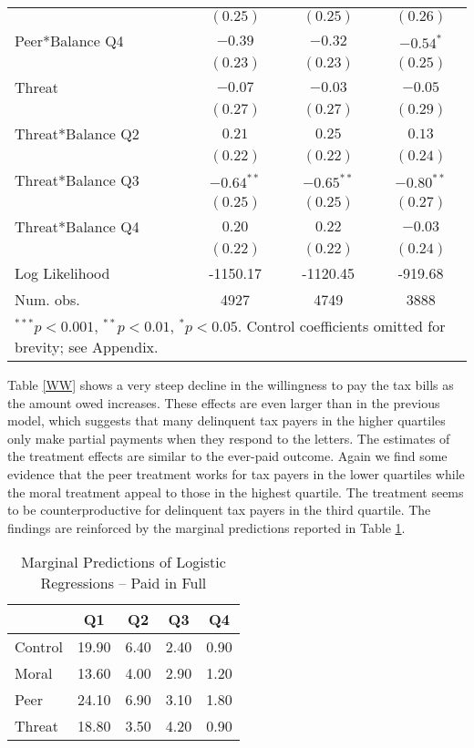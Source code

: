 \documentclass[12pt,titlepage]{article}
\begin{document}
\begin{table}[htbp]
{\begin{center}
\begin{tabular}{l c c c }
                  & $(0.25)$      & $(0.25)$      & $(0.26)$      \\
Peer*Balance Q4   & $-0.39$       & $-0.32$       & $-0.54^{*}$   \\
                  & $(0.23)$      & $(0.23)$      & $(0.25)$      \\
Threat            & $-0.07$       & $-0.03$       & $-0.05$       \\
                  & $(0.27)$      & $(0.27)$      & $(0.29)$      \\
Threat*Balance Q2 & $0.21$        & $0.25$        & $0.13$        \\
                  & $(0.22)$      & $(0.22)$      & $(0.24)$      \\
Threat*Balance Q3 & $-0.64^{**}$  & $-0.65^{**}$  & $-0.80^{**}$  \\
                  & $(0.25)$      & $(0.25)$      & $(0.27)$      \\
Threat*Balance Q4 & $0.20$        & $0.22$        & $-0.03$       \\
                  & $(0.22)$      & $(0.22)$      & $(0.24)$      \\
\hline
Log Likelihood    & -1150.17      & -1120.45      & -919.68       \\
Num. obs.         & 4927          & 4749          & 3888          \\
\hline
\multicolumn{4}{l}{\scriptsize{$^{***}p<0.001$, $^{**}p<0.01$, $^*p<0.05$. Control coefficients omitted for brevity; see Appendix.}}
\end{tabular}
\end{center}
}
\end{table}

Table \ref{WW} shows a very steep decline in the willingness to pay
the tax bills as the amount owed increases.  These effects are even
larger than in the previous model, which suggests that many delinquent
tax payers in the higher quartiles only make partial payments when
they respond to the letters. The estimates of the treatment effects
are similar to the ever-paid outcome. Again we find some evidence that
the peer treatment works for tax payers in the lower quartiles while
the moral treatment appeal to those in the highest quartile. The
treatment seems to be counterproductive for delinquent tax payers in
the third quartile. The findings are reinforced by the marginal
predictions reported in Table \ref{TT}.

\begin{table}[htbp]
\caption{Marginal Predictions of Logistic Regressions -- Paid in Full}  \label{TT}
\centering
\begin{tabular}{lcccc}
  \hline
 & Q1 & Q2 & Q3 & Q4 \\ 
  \hline
Control & 19.90 & 6.40 & 2.40 & 0.90 \\ 
  Moral & 13.60 & 4.00 & 2.90 & 1.20 \\ 
  Peer & 24.10 & 6.90 & 3.10 & 1.80 \\ 
  Threat & 18.80 & 3.50 & 4.20 & 0.90 \\ 
   \hline
\end{tabular}
\end{table}
\end{document}
